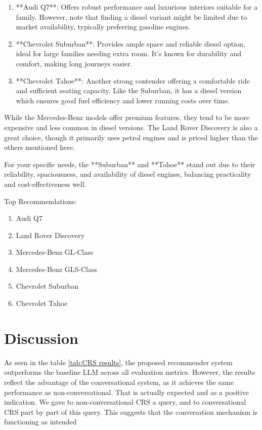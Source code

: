 \documentclass[fleqn,moreauthors,10pt]{ds_report}
\begin{document}
\begin{enumerate}
    \item **Audi Q7**: Offers robust performance and luxurious interiors suitable for a family. However, note that finding a diesel variant might be limited due to market availability, typically preferring gasoline engines. 
    \item **Chevrolet Suburban**: Provides ample space and reliable diesel option, ideal for large families needing extra room. It's known for durability and comfort, making long journeys easier.
    \item **Chevrolet Tahoe**: Another strong contender offering a comfortable ride and sufficient seating capacity. Like the Suburban, it has a diesel version which ensures good fuel efficiency and lower running costs over time.
\end{enumerate}

\noindent
While the Mercedes-Benz models offer premium features, they tend to be more expensive and less common 
in diesel versions. The Land Rover Discovery is also a great choice, though it primarily uses petrol 
engines and is priced higher than the others mentioned here.

\noindent
For your specific needs, the **Suburban** and **Tahoe** stand out due to their reliability, spaciousness, 
and availability of diesel engines, balancing practicality and cost-effectiveness well.

\noindent
Top Recommendations:

\begin{enumerate}[itemsep=0pt, topsep=0pt]
    \item Audi Q7
    \item Land Rover Discovery
    \item Mercedes-Benz GL-Class
    \item Mercedes-Benz GLS-Class
    \item Chevrolet Suburban
    \item Chevrolet Tahoe
\end{enumerate}


\section*{Discussion}

As seen in the table \ref{tab:CRS results}, the proposed recommender system 
outperforms the baseline LLM across all evaluation metrics. However, the results 
reflect the advantage of the conversational system, as it achieves the same performance as non-conversational.
That is actually expected and as a positive indication. We gave to non-conversational CRS 
a query, and to conversational CRS part by part of this query. This suggests that the 
conversation mechanism is functioning as intended
\end{document}
